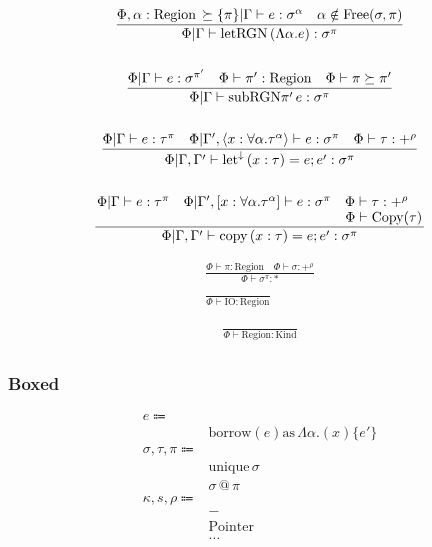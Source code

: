 \documentclass {article}
\begin{document}
\begin{gather*}
\frac
{\Phi , \alpha : \text{Region} \, \succeq \{ \pi \} | \Gamma \vdash e : \sigma^\alpha \quad \alpha \notin \text{Free}(\sigma, \pi)}
{\Phi | \Gamma \vdash \text{letRGN} \, (\Lambda \alpha. e) : \sigma^\pi} \\
\\
\frac
{\Phi | \Gamma \vdash e : \sigma^{\pi'} \quad \Phi \vdash \pi' : \text{Region} \quad \Phi \vdash \pi \succeq \pi' }
{\Phi | \Gamma \vdash \text{subRGN} \pi' \, e : \sigma^{\pi} } \\
\\
\frac
{\Phi | \Gamma \vdash e : \tau^\pi \quad \Phi | \Gamma', \langle x : \forall \alpha. \tau^\alpha \rangle \vdash e : \sigma^\pi \quad \Phi \vdash \tau : +^{\rho}}
{\Phi | \Gamma, \Gamma' \vdash \text{let}^\downarrow \, (x : \tau) = e; e' : \sigma^\pi} \\
\\
\frac
{\splitfrac{\Phi | \Gamma \vdash e : \tau^\pi \quad \Phi | \Gamma', [ x : \forall \alpha. \tau^\alpha ] \vdash e : \sigma^\pi \quad \Phi \vdash \tau : +^{\rho}}
{\Phi \vdash \text{Copy}(\tau)}}
{\Phi | \Gamma, \Gamma' \vdash \text{copy} \, (x : \tau) = e; e' : \sigma^\pi} \\
\end{gather*}

\begin{gather*}
\frac
{\Phi \vdash \pi : \text{Region} \quad \Phi \vdash \sigma : +^\rho}
{\Phi \vdash \sigma^\pi : *} \\
\\
\frac
{}
{\Phi \vdash \text{IO} : \text{Region}}
\end{gather*}

\begin{gather*}
\frac
{}
{\Phi \vdash \text{Region} : \text{Kind}} \\
\end{gather*}

\subsubsection{Boxed}
\begin{align*}
e \Coloneqq & \\
& \text{borrow} (e) \text{as} \, \Lambda \alpha. (x) \{ e' \} \\
\sigma, \tau, \pi \Coloneqq & \\
& \text{unique} \, \sigma \\
& \sigma \, @ \, \pi \\
\kappa, s, \rho \Coloneqq & \\
& - \tag{Boxed} \\
& \text{Pointer} \tag{Pointer Representation} \\
& \dots \\
\end{align*}
\end{document}
